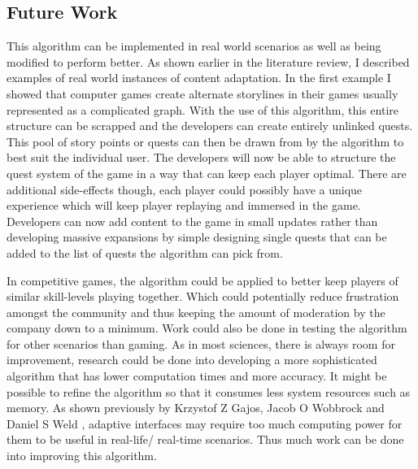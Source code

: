 \documentclass[11pt]{article}
\begin{document}
\subsection{Future Work}
This algorithm can be implemented in real world scenarios as well as being modified to perform better. As shown earlier in the literature review, I described examples of real world instances of content adaptation. In the first example I showed that computer games create alternate storylines in their games usually represented as a complicated graph. With the use of this algorithm, this entire structure can be scrapped and the developers can create entirely unlinked quests. This pool of story points or quests can then be drawn from by the algorithm to best suit the individual user. The developers will now be able to structure the quest system of the game in a way that can keep each player optimal. There are additional side-effects though, each player could possibly have a unique experience which will keep player replaying and immersed in the game. Developers can now add content to the game in small updates rather than developing massive expansions by simple designing single quests that can be added to the list of quests the algorithm can pick from.
\vspace{6.0 mm}

In competitive games, the algorithm could be applied to better keep players of similar skill-levels playing together. Which could potentially reduce frustration amongst the community and thus keeping the amount of moderation by the company down to a minimum. Work could also be done in testing the algorithm for other scenarios than gaming. As in most sciences, there is always room for improvement, research could be done into developing a more sophisticated algorithm that has lower computation times and more accuracy. It might be possible to refine the algorithm so that it consumes less system resources such as memory. As shown previously by Krzystof Z Gajos, Jacob O Wobbrock and Daniel S Weld \citep{gajos2008improving}, adaptive interfaces may require too much computing power for them to be useful in real-life/ real-time scenarios. Thus much work can be done into improving this algorithm.
\clearpage
\end{document}
